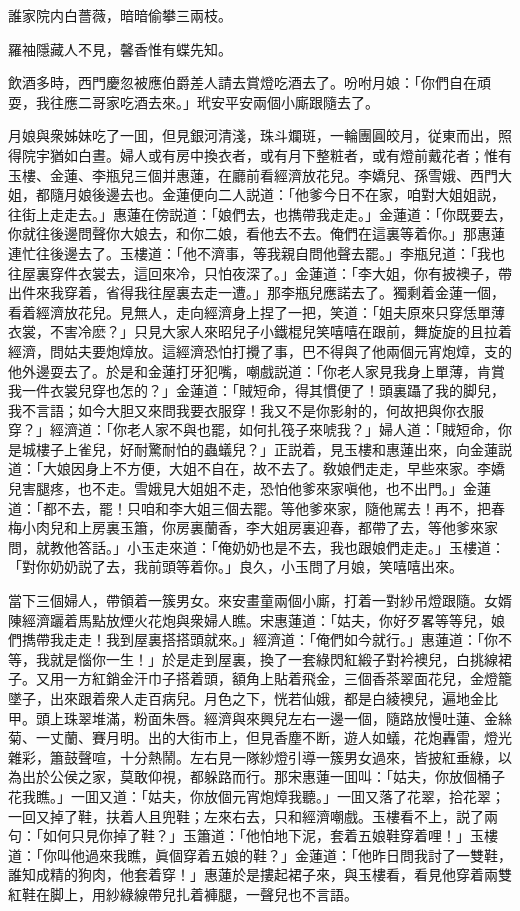 \begin{myquote}
誰家院内白薔薇，暗暗偷攀三兩枝。

羅袖隱藏人不見，馨香惟有蝶先知。
\end{myquote}

飲酒多時，西門慶忽被應伯爵差人請去賞燈吃酒去了。吩咐月娘：「你們自在頑耍，我往應二哥家吃酒去來。」玳安平安兩個小廝跟隨去了。

月娘與衆姊妹吃了一囬，但見銀河清淺，珠斗斕斑，一輪團圓皎月，従東而出，照得院宇猶如白晝。婦人或有房中換衣者，或有月下整粧者，或有燈前戴花者；惟有玉樓、金蓮、李瓶兒三個并惠蓮，在廳前看經濟放花兒。李嬌兒、孫雪娥、西門大姐，都隨月娘後邊去也。金蓮便向二人説道：「他爹今日不在家，咱對大姐姐説，往街上走走去。」惠蓮在傍説道：「娘們去，也擕帶我走走。」金蓮道：「你既要去，你就往後邊問聲你大娘去，和你二娘，看他去不去。俺們在這裏等着你。」那惠蓮連忙往後邊去了。玉樓道：「他不濟事，等我親自問他聲去罷。」李瓶兒道：「我也往屋裏穿件衣裳去，這回來冷，只怕夜深了。」金蓮道：「李大姐，你有披襖子，帶出件來我穿着，省得我往屋裏去走一遭。」那李瓶兒應諾去了。獨剩着金蓮一個，看着經濟放花兒。見無人，走向經濟身上捏了一把，笑道：「姐夫原來只穿恁單薄衣裳，不害冷麽？」只見大家人來昭兒子小鐵棍兒笑嘻嘻在跟前，舞旋旋的且拉着經濟，問姑夫要炮𤍤放。這經濟恐怕打攪了事，巴不得與了他兩個元宵炮𤍤，支的他外邊耍去了。於是和金蓮打牙犯嘴，嘲戲説道：「你老人家見我身上單薄，肯賞我一件衣裳兒穿也怎的？」金蓮道：「賊短命，得其慣便了！頭裏躡了我的脚兒，我不言語；如今大胆又來問我要衣服穿！我又不是你影射的，何故把與你衣服穿？」經濟道：「你老人家不與也罷，如何扎筏子來唬我？」婦人道：「賊短命，你是城樓子上雀兒，好耐驚耐怕的蟲蟻兒？」正説着，見玉樓和惠蓮出來，向金蓮説道：「大娘因身上不方便，大姐不自在，故不去了。敎娘們走走，早些來家。李嬌兒害腿疼，也不走。雪娥見大姐姐不走，恐怕他爹來家嗔他，也不出門。」金蓮道：「都不去，罷！只咱和李大姐三個去罷。等他爹來家，隨他駡去！再不，把春梅小肉兒和上房裏玉簫，你房裏蘭香，李大姐房裏迎春，都帶了去，等他爹來家問，就教他答話。」小玉走來道：「俺奶奶也是不去，我也跟娘們走走。」玉樓道：「對你奶奶説了去，我前頭等着你。」良久，小玉問了月娘，笑嘻嘻出來。

當下三個婦人，帶領着一簇男女。來安畫童兩個小廝，打着一對紗吊燈跟隨。女婿陳經濟躧着馬點放煙火花炮與衆婦人瞧。宋惠蓮道：「姑夫，你好歹畧等等兒，娘們擕帶我走走！我到屋裏搭搭頭就來。」經濟道：「俺們如今就行。」惠蓮道：「你不等，我就是惱你一生！」於是走到屋裏，換了一套綠閃紅緞子對衿襖兒，白挑線裙子。又用一方紅銷金汗巾子搭着頭，額角上貼着飛金，三個香茶翠面花兒，金燈籠墜子，出來跟着衆人走百病兒。月色之下，恍若仙娥，都是白綾襖兒，遍地金比甲。頭上珠翠堆滿，粉面朱唇。經濟與來興兒左右一邊一個，隨路放慢吐蓮、金絲菊、一丈蘭、賽月明。出的大街市上，但見香塵不断，遊人如蟻，花炮轟雷，燈光雜彩，簫鼓聲喧，十分熱鬧。左右見一隊紗燈引導一簇男女過來，皆披紅垂綠，以為出於公侯之家，莫敢仰視，都躲路而行。那宋惠蓮一囬叫：「姑夫，你放個桶子花我瞧。」一囬又道：「姑夫，你放個元宵炮𤍤我聽。」一囬又落了花翠，拾花翠；一回又掉了鞋，扶着人且兜鞋；左來右去，只和經濟嘲戲。玉樓看不上，説了兩句：「如何只見你掉了鞋？」玉簫道：「他怕地下泥，套着五娘鞋穿着哩！」玉樓道：「你叫他過來我瞧，眞個穿着五娘的鞋？」金蓮道：「他昨日問我討了一雙鞋，誰知成精的狗肉，他套着穿！」惠蓮於是摟起裙子來，與玉樓看，看見他穿着兩雙紅鞋在脚上，用紗綠線帶兒扎着褲腿，一聲兒也不言語。

